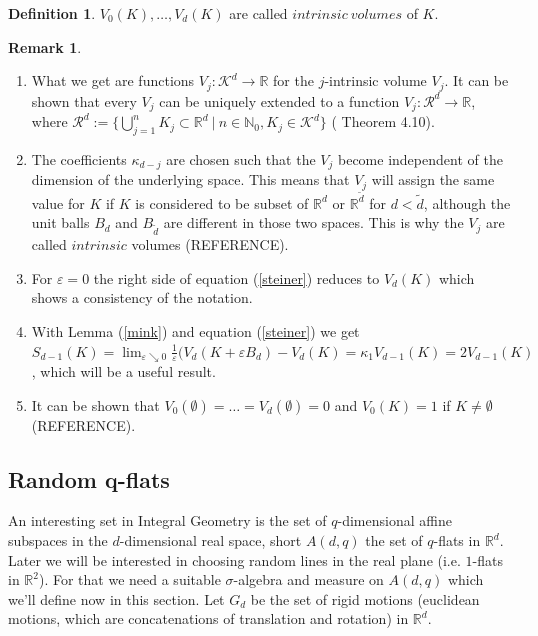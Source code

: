 \documentclass[12pt,a4paper]{scrartcl}
\numberwithin{equation}{subsection}
\newcommand{\R}{\mathbb{R}} %
\newcommand{\N}{\mathbb{N}} %
\newcommand{\K}{\mathcal{K}}
\newcommand{\1}{\mathbbm{1}}
\numberwithin{equation}{section}
\theoremstyle{definition}
\newtheorem{definition}{Definition}[subsection]
\newtheorem{remark}{Remark}[subsection]
\begin{document}
\begin{definition}
	$V_0(K),\dots, V_d(K)$ are called $\mathit{intrinsic\ volumes}$ of $K$. 
\end{definition}

\begin{remark}\label{Vjprop}
	\begin{enumerate}[label=(\roman*)]
		\item What we get are functions $V_j:\K^d \to \R$ for the $j$-intrinsic volume $V_j$. It can be shown that every $V_j$ can be uniquely extended to a function $V_j: \mathcal{R}^d \to \R$, where $\mathcal{R}^d := \{\bigcup_{j=1}^n K_j\subset \R^d\ |\ n\in \N_0,K_j\in \K^d \}$ (\cite{stoch1} Theorem 4.10).
		\item The coefficients $\kappa_{d-j}$ are chosen such that the $V_j$ become independent of the dimension of the underlying space. This means that $V_j$ will assign the same value for $K$ if $K$ is considered to be subset of $\R^d$ or $\R^{\tilde{d}}$ for  $d<\tilde{d}$, although the unit balls $B_d$ and $B_{\tilde d}$ are different in those two spaces. This is why the $V_j$ are called $\mathit{intrinsic}$ volumes (REFERENCE). 
		\item For $\varepsilon = 0$ the right side of equation (\ref{steiner}) reduces to $V_d(K)$ which shows a consistency of the notation. 
		\item With Lemma (\ref{mink}) and equation (\ref{steiner}) we get $S_{d-1}(K) = \lim_{\varepsilon \searrow 0} \frac{1}{\varepsilon} (V_d(K + \varepsilon B_d) - V_d(K) = \kappa_1 V_{d-1}(K) = 2V_{d-1}(K)$, which will be a useful result. 
		\item It can be shown that $V_0(\emptyset)=\dots=V_d(\emptyset)=0$ and $V_0(K)=1$ if $K\neq \emptyset$ (REFERENCE). 
	\end{enumerate}
\end{remark}

\subsection{Random q-flats}

An interesting set in Integral Geometry is the set of $q$-dimensional affine subspaces in the $d$-dimensional real space, short $A(d,q)$ the set of $q$-flats in $\R^d$. 
Later we will be interested in choosing random lines in the real plane (i.e. $1$-flats in $\R^2$). For that we need a suitable $\sigma$-algebra and measure on $A(d,q)$ which we'll define now in this section. Let $G_d$ be the set of rigid motions (euclidean motions, which are concatenations of translation and rotation) in $\R^d$. 
\end{document}
